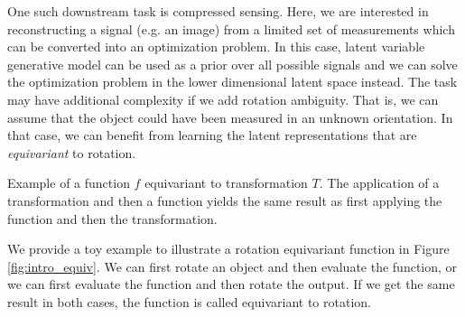 One such downstream task is compressed sensing. Here, we are interested in reconstructing a signal (e.g. an image) from a limited set of measurements which can be converted into an optimization problem. In this case, latent variable generative model can be used as a prior over all possible signals and we can solve the optimization problem in the lower dimensional latent space instead. 
The task may have additional complexity if we add rotation ambiguity. That is, we can assume that the object could have been measured in an unknown orientation. In that case, we can benefit from learning the latent representations that are \textit{equivariant} to rotation. 
\begin{marginfigure}
\caption{Example of a function $f$ equivariant to transformation $T$. The application of a transformation and then a function yields the same result as first applying the function and then the transformation.}\label{fig:intro_equiv}
\end{marginfigure}

We provide a toy example to illustrate a rotation equivariant function in Figure \ref{fig:intro_equiv}. We can first rotate an object and then evaluate the function, or we can first evaluate the function and then rotate the output. If we get the same result in both cases, the function is called equivariant to rotation. 

